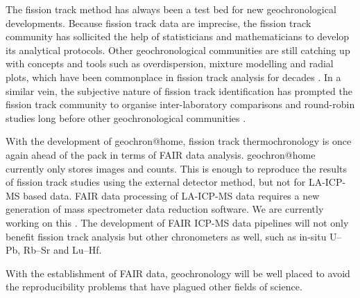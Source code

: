 \documentclass[gchron, manuscript]{copernicus}
\begin{document}
The fission track method has always been a test bed for new
geochronological developments.  Because fission track data are
imprecise, the fission track community has sollicited the help of
statisticians and mathematicians to develop its analytical protocols.
Other geochronological communities are still catching up with concepts
and tools such as overdispersion, mixture modelling and radial plots,
which have been commonplace in fission track analysis for decades
\citep{vermeesch2019b}. In a similar vein, the subjective nature of
fission track identification has prompted the fission track community
to organise inter-laboratory comparisons and round-robin studies long
before other geochronological communities
\citep{miller1985,tamer2025}.\medskip

With the development of geochron@home, fission track thermochronology
is once again ahead of the pack in terms of FAIR data analysis.
geochron@home currently only stores images and counts. This is enough
to reproduce the results of fission track studies using the external
detector method, but not for LA-ICP-MS based data. FAIR data
processing of LA-ICP-MS data requires a new generation of mass
spectrometer data reduction software. We are currently working on this
\citep{vermeesch2025b}. The development of FAIR ICP-MS data pipelines
will not only benefit fission track analysis but other chronometers as
well, such as in-situ U--Pb, Rb--Sr and Lu--Hf.\medskip

With the establishment of FAIR data, geochronology will be well placed
to avoid the reproducibility problems that have plagued other fields
of science.



\end{document}
